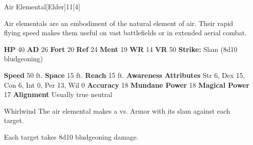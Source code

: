   \begin{monsection}{Air Elemental}[Elder]{11}[4]
    \vspace{-1em}\vspace{-1em}
    \vspace{0em}

    
    Air elementals are an embodiment of the natural element of air.
    Their rapid flying speed makes them useful on vast battlefields or in extended aerial combat.
  
    

    \begin{spellcontent}
      \begin{spelltargetinginfo}
        \pari \textbf{HP} 40 \monsep
          \textbf{AD} 26 \monsep
          \textbf{Fort} 20 \monsep
          \textbf{Ref} 24 \monsep
          \textbf{Ment} 19
        \pari \textbf{WR} 14 \monsep
        \textbf{VR} 50
        \pari \textbf{Strike:}
            Slam  (8d10 bludgeoning)
      \end{spelltargetinginfo}
    \end{spellcontent}
    \begin{monsterfooter}
      \pari \textbf{Speed} 50 ft. \monsep
        \textbf{Space} 15 ft. \monsep
        \textbf{Reach} 15 ft.
      \pari \textbf{Awareness} 
      \pari \textbf{Attributes}
        Str 6, Dex 15,
        Con 6, Int 0,
        Per 13, Wil 0
      \pari \textbf{Accuracy} 18 \monsep
        \textbf{Mundane Power} 18 \monsep
      \textbf{Magical Power} 17
      \pari \textbf{Alignment} Usually true neutral
    \end{monsterfooter}
  \end{monsection}
  \begin{freeability}{Whirlwind}
       The air elemental makes a 
         vs. Armor
        with its slam against each target.
    
    \hit Each target takes 8d10 bludgeoning damage.
    \end{freeability}
  
